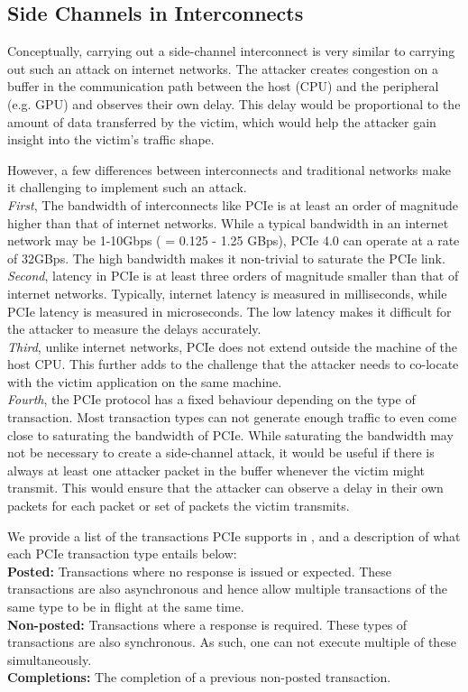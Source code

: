 \subsection{Side Channels in Interconnects}
\label{subsec:interconnect-sc-background-side-channels}

Conceptually, carrying out a side-channel interconnect is very similar to carrying out such an attack on internet networks. 
The attacker creates congestion on a buffer in the communication path between the host (CPU) and the peripheral (e.g. GPU) and observes their own delay.
This delay would be proportional to the amount of data transferred by the victim, which would help the attacker gain insight into the victim's traffic shape.

However, a few differences between interconnects and traditional networks make it challenging to implement such an attack. \\
\textit{First}, The bandwidth of interconnects like PCIe is at least an order of magnitude higher than that of internet networks.
While a typical bandwidth in an internet network may be 1-10Gbps ( = 0.125 - 1.25 GBps), PCIe 4.0 can operate at a rate of 32GBps.
The high bandwidth makes it non-trivial to saturate the PCIe link. \\
\textit{Second}, latency in PCIe is at least three orders of magnitude smaller than that of internet networks.
Typically, internet latency is measured in milliseconds, while PCIe latency is measured in microseconds.
The low latency makes it difficult for the attacker to measure the delays accurately. \\
\textit{Third}, unlike internet networks, PCIe does not extend outside the machine of the host CPU.
This further adds to the challenge that the attacker needs to co-locate with the victim application on the same machine. \\
\textit{Fourth}, the PCIe protocol has a fixed behaviour depending on the type of transaction. 
Most transaction types can not generate enough traffic to even come close to saturating the bandwidth of PCIe. 
While saturating the bandwidth may not be necessary to create a side-channel attack, it would be useful if there is always at least one attacker packet in the buffer whenever the victim might transmit.
This would ensure that the attacker can observe a delay in their own packets for each packet or set of packets the victim transmits.

We provide a list of the transactions PCIe supports in , and a description of what each PCIe transaction type entails below: \\
\textbf{Posted:} Transactions where no response is issued or expected. 
These transactions are also asynchronous and hence allow multiple transactions of the same type to be in flight at the same time.\\
\textbf{Non-posted:} Transactions where a response is required. 
These types of transactions are also synchronous.
As such, one can not execute multiple of these simultaneously.\\
\textbf{Completions:} The completion of a previous non-posted transaction.\\

